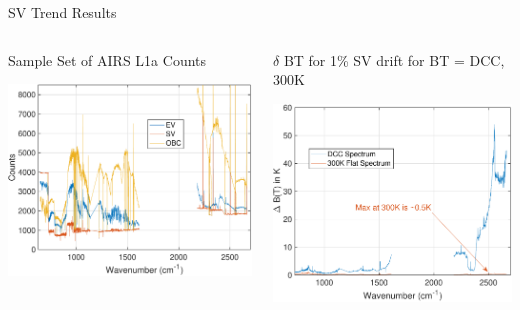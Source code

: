 \documentclass[10pt,t]{beamer}
\begin{document}
\begin{frame}[label={sec:org70b8f99}]{SV Trend Results}
\vspace{-0.4in}

\begin{columns}
\begin{column}{0.5\columnwidth}
\begin{block}{\scriptsize Sample Set of AIRS L1a Counts}
\vspace{-0.12in}
\begin{center}
\includegraphics[width=0.95\linewidth]{./Figs/Pdf/airs_counts_example.pdf}
\end{center}
\end{block}
\end{column}

\begin{column}{0.5\columnwidth}
\begin{block}{\scriptsize \(\delta\) BT for 1\% SV drift for BT = DCC, 300K}
\vspace{-0.12in}
\begin{center}
\includegraphics[width=0.93\linewidth]{./Figs/Pdf/dbt_for_minus1pc_dsv_for_dcc_spectrum_and_300k.pdf}
\end{center}
\end{block}
\end{column}
\end{columns}



\end{frame}
\end{document}
